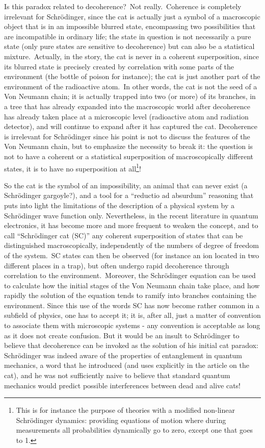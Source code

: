 \documentclass[12pt,onecolumn]{article}%
\begin{document}
Is this paradox related to decoherence?\ Not really.\ Coherence is completely
irrelevant for Schr\"{o}dinger, since the cat is actually just a symbol of a
macroscopic object that is in an impossible blurred state, encompassing two
possibilities that are incompatible in ordinary life; the state in question is
not necessarily a pure state (only pure states are sensitive to decoherence)
but can also be a statistical mixture.\ Actually, in the story, the cat is
never in a coherent superposition, since its blurred state is precisely
created by correlation with some parts of the environment (the bottle of
poison for instance); the cat is just another part of the environment of the
radioactive atom.\ In other words, the cat is not the seed of a Von Neumann
chain; it is actually trapped into two (or more) of its branches, in a tree
that has already expanded into the macroscopic world after decoherence has
already taken place at a microscopic level (radioactive atom and radiation
detector), and will continue to expand after it has captured the cat.
Decoherence is irrelevant for Schr\"{o}dinger since his point is not to
discuss the features of the Von Neumann chain, but to emphasize the necessity
to break it: the question is not to have a coherent or a statistical
superposition of macroscopically different states, it is to have no
superposition at all\footnote{This is for instance the purpose of theories
with a modified non-linear Schr\"{o}dinger dynamics: providing equations of
motion where during measurements all probabilities dynamically go to zero,
except one that goes to 1.}!

So the cat is the symbol of an impossibility, an animal that can never exist
(a Schr\"{o}dinger gargoyle?), and a tool for a ``reductio ad absurdum''
reasoning that puts into light the limitations of the description of a
physical system by a Schr\"{o}dinger wave function only. Nevertheless, in the
recent literature in quantum electronics, it has become more and more frequent
to weaken the concept, and to call ``Schr\"{o}dinger cat (SC)'' any coherent
superposition of states that can be distinguished macroscopically,
independently of the numbers of degree of freedom of the system.\ SC states
can then be observed (for instance an ion located in two different places in a
trap), but often undergo rapid decoherence through correlation to the
environment.\ Moreover, the Schr\"{o}dinger equation can be used to calculate
how the initial stages of the Von Neumann chain take place, and how rapidly
the solution of the equation tends to ramify into branches containing the
environment. Since this use of the words SC has now become rather common in a
subfield of physics, one has to accept it; it is, after all, just a matter of
convention to associate them with microscopic systems - any convention is
acceptable as long as it does not create confusion. But it would be an insult
to Schr\"{o}dinger to believe that decoherence can be invoked as the solution
of his initial cat paradox: Schr\"{o}dinger was indeed aware of the properties
of entanglement in quantum mechanics, a word that he introduced (and uses
explicitly in the article on the cat), and he was not sufficiently naive to
believe that standard quantum mechanics would predict possible interferences
between dead and alive cats!
\end{document}
